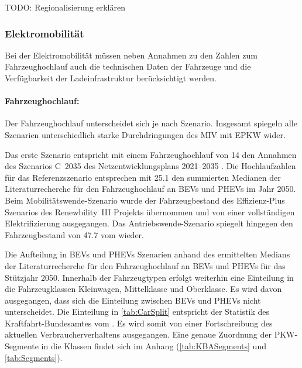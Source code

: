 

{\color{red} TODO: Regionalisierung erklären}

\subsubsection{Elektromobilität}\label{chap:EMob_Szenarien}

Bei der Elektromobilität müssen neben Annahmen zu den Zahlen zum Fahrzeughochlauf auch die technischen Daten der Fahrzeuge und die Verfügbarkeit der Ladeinfrastruktur berücksichtigt werden.

\paragraph{Fahrzeughochlauf:}
Der Fahrzeughochlauf unterscheidet sich je nach Szenario.
Insgesamt spiegeln alle Szenarien unterschiedlich starke Durchdringungen des \gls{MIV} mit \gls{EPKW} wider.\medskip

Das erste Szenario entspricht mit einem Fahrzeughochlauf von \SI{14}{\MioStk} den Annahmen des Szenarios C~\num{2035} des Netzentwicklungsplans \numrange[range-phrase=~{--}~]{2021}{2035} \cite{BNetzA2020}.
Die Hochlaufzahlen für das Referenzszenario entsprechen mit \SI{25.1}{\MioStk} den summierten Medianen der Literaturrecherche für den Fahrzeughochlauf an \glspl{BEV} und \glspl{PHEV} im Jahr \num{2050}.
Beim Mobilitätswende-Szenario wurde der Fahrzeugbestand des Effizienz-Plus Szenarios des Renewbility~III Projekts \cite{Institut2016} übernommen und von einer vollständigen Elektrifizierung ausgegangen.
Das Antriebswende-Szenario spiegelt hingegen den Fahrzeugbestand von \SI{47.7}{\MioStk} vom  \cite{KBA2020} wieder.



Die Aufteilung in \glspl{BEV} und \glspl{PHEV} Szenarien anhand des ermittelten Medians der Literaturrecherche für den Fahrzeughochlauf an \glspl{BEV} und \glspl{PHEV} für das Stützjahr \num{2050}.
Innerhalb der Fahrzeugtypen erfolgt weiterhin eine Einteilung in die Fahrzeugklassen Kleinwagen, Mittelklasse und Oberklasse.
Es wird davon ausgegangen, dass sich die Einteilung zwischen \glspl{BEV} und \glspl{PHEV} nicht unterscheidet.
Die Einteilung in \autoref{tab:CarSplit} entspricht der Statistik des Kraftfahrt-Bundesamtes \cite{KBASegments2020} vom .
Es wird somit von einer Fortschreibung des aktuellen Verbraucherverhaltens ausgegangen.
Eine genaue Zuordnung der \gls{PKW}-Segmente in die Klassen findet sich im Anhang (\autoref{tab:KBASegments} und \autoref{tab:Segments}).

